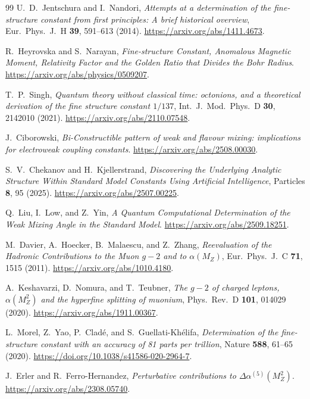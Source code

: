 \documentclass[11pt]{article}
\theoremstyle{remark}
\begin{document}
\begin{thebibliography}{99}
U.\ D.\ Jentschura and I.\ Nandori,
\emph{Attempts at a determination of the fine-structure constant from first principles: A brief historical overview},
Eur.\ Phys.\ J.\ H \textbf{39}, 591--613 (2014).
\url{https://arxiv.org/abs/1411.4673}.

R.\ Heyrovska and S.\ Narayan,
\emph{Fine-structure Constant, Anomalous Magnetic Moment, Relativity Factor and the Golden Ratio that Divides the Bohr Radius}.
\url{https://arxiv.org/abs/physics/0509207}.

T.\ P.\ Singh,
\emph{Quantum theory without classical time: octonions, and a theoretical derivation of the fine structure constant \(1/137\)},
Int.\ J.\ Mod.\ Phys.\ D \textbf{30}, 2142010 (2021).
\url{https://arxiv.org/abs/2110.07548}.

J.\ Ciborowski,
\emph{Bi-Constructible pattern of weak and flavour mixing: implications for electroweak coupling constants}.
\url{https://arxiv.org/abs/2508.00030}.

S.\ V.\ Chekanov and H.\ Kjellerstrand,
\emph{Discovering the Underlying Analytic Structure Within Standard Model Constants Using Artificial Intelligence},
Particles \textbf{8}, 95 (2025).
\url{https://arxiv.org/abs/2507.00225}.

Q.\ Liu, I.\ Low, and Z.\ Yin,
\emph{A Quantum Computational Determination of the Weak Mixing Angle in the Standard Model}.
\url{https://arxiv.org/abs/2509.18251}.

M.\ Davier, A.\ Hoecker, B.\ Malaescu, and Z.\ Zhang,
\emph{Reevaluation of the Hadronic Contributions to the Muon \(g-2\) and to \(\alpha(M_Z)\)},
Eur.\ Phys.\ J.\ C \textbf{71}, 1515 (2011).
\url{https://arxiv.org/abs/1010.4180}.

A.\ Keshavarzi, D.\ Nomura, and T.\ Teubner,
\emph{The \(g-2\) of charged leptons, \(\alpha(M_Z^2)\) and the hyperfine splitting of muonium},
Phys.\ Rev.\ D \textbf{101}, 014029 (2020).
\url{https://arxiv.org/abs/1911.00367}.

L.\ Morel, Z.\ Yao, P.\ Cladé, and S.\ Guellati-Khélifa,
\emph{Determination of the fine-structure constant with an accuracy of 81 parts per trillion},
Nature \textbf{588}, 61--65 (2020).
\url{https://doi.org/10.1038/s41586-020-2964-7}.

J.\ Erler and R.\ Ferro-Hernandez,
\emph{Perturbative contributions to \(\Delta\alpha^{(5)}(M_Z^2)\)}.
\url{https://arxiv.org/abs/2308.05740}.


\end{thebibliography}
\end{document}
